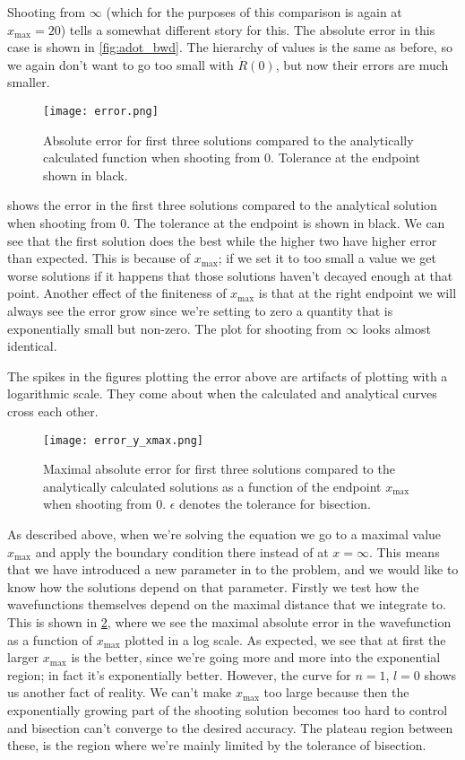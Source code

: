 \documentclass[10pt,a4paper,twocolumn]{article}
\begin{document}
Shooting from $\infty$ (which for the purposes of this comparison is again at $x_{\mathrm{max}} = 20$) tells a somewhat different story for this. The absolute error in this case is shown in \cref{fig:adot_bwd}. The hierarchy of values is the same as before, so we again don't want to go too small with $\dot{R}(0)$, but now their errors are much smaller.

\begin{figure}[h]
    \centering
    \texttt{[image: error.png]}
    \caption{Absolute error for first three solutions compared to the analytically calculated function when shooting from $0$. Tolerance at the endpoint shown in black.}
    \label{fig:error}
\end{figure}

 shows the error in the first three solutions compared to the analytical solution when shooting from $0$. The tolerance at the endpoint is shown in black. We can see that the first solution does the best while the higher two have higher error than expected. This is because of $x_{\mathrm{max}}$; if we set it to too small a value we get worse solutions if it happens that those solutions haven't decayed enough at that point. Another effect of the finiteness of $x_{\mathrm{max}}$ is that at the right endpoint we will always see the error grow since we're setting to zero a quantity that is exponentially small but non-zero. The plot for shooting from $\infty$ looks almost identical.

The spikes in the figures plotting the error above are artifacts of plotting with a logarithmic scale. They come about when the calculated and analytical curves cross each other.

\begin{figure}[h]
    \centering
    \texttt{[image: error\_y\_xmax.png]}
    \caption{Maximal absolute error for first three solutions compared to the analytically calculated solutions as a function of the endpoint $x_{\mathrm{max}}$ when shooting from $0$. $\epsilon$ denotes the tolerance for bisection.}
    \label{fig:error_y_xmax}
\end{figure}

As described above, when we're solving the equation we go to a maximal value $x_{\mathrm{max}}$ and apply the boundary condition there instead of at $x=\infty$. This means that we have introduced a new parameter in to the problem, and we would like to know how the solutions depend on that parameter. Firstly we test how the wavefunctions themselves depend on the maximal distance that we integrate to. This is shown in \cref{fig:error_y_xmax}, where we see the maximal absolute error in the wavefunction as a function of $x_{\mathrm{max}}$ plotted in a log scale. As expected, we see that at first the larger $x_{\mathrm{max}}$ is the better, since we're going more and more into the exponential region; in fact it's exponentially better. However, the curve for $n=1$, $l=0$ shows us another fact of reality. We can't make $x_{\mathrm{max}}$ too large because then the exponentially growing part of the shooting solution becomes too hard to control and bisection can't converge to the desired accuracy. The plateau region between these, is the region where we're mainly limited by the tolerance of bisection.
\end{document}
